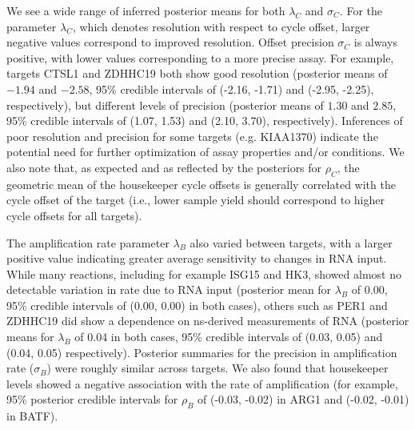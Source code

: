 \documentclass[../thesis.tex]{subfiles}
\begin{document}
We see a wide range of inferred posterior means for both $\lambda_C$ and $\sigma_C$. For the parameter $\lambda_C$, which denotes resolution with respect to cycle offset, larger negative values correspond to improved resolution. Offset precision $\sigma_C$ is always positive, with lower values corresponding to a more precise assay. For example, targets {CTSL1} and {ZDHHC19} both show good resolution (posterior means of $-1.94$ and $-2.58$, 95\% credible intervals of (-2.16, -1.71) and (-2.95, -2.25), respectively), but different levels of precision (posterior means of $1.30$ and $2.85$, 95\% credible intervals of (1.07, 1.53) and (2.10, 3.70), respectively). Inferences of poor resolution and precision for some targets (e.g. {KIAA1370}) indicate the potential need for further optimization of assay properties and/or conditions. We also note that, as expected and as reflected by the posteriors for $\rho_C$, the geometric mean of the housekeeper cycle offsets is generally correlated with the cycle offset of the target (i.e., lower sample yield should correspond to higher cycle offsets for all targets). 

The amplification rate parameter $\lambda_B$ also varied between targets, with a larger positive value indicating greater average sensitivity to changes in RNA input. While many reactions, including for example {ISG15} and {HK3}, showed almost no detectable variation in rate due to RNA input (posterior mean for $\lambda_B$ of 0.00, 95\% credible intervals of (0.00, 0.00) in both cases), others such as {PER1} and {ZDHHC19} did show a dependence on \gls{ns}-derived measurements of RNA (posterior means for $\lambda_B$ of 0.04 in both cases, 95\% credible intervals of (0.03, 0.05) and (0.04, 0.05) respectively). Posterior summaries for the precision in amplification rate ($\sigma_{B}$) were roughly similar across targets. We also found that housekeeper levels showed a negative association with the rate of amplification (for example, 95\% posterior credible intervals for $\rho_B$ of (-0.03, -0.02) in ARG1 and (-0.02, -0.01) in BATF).
\end{document}
